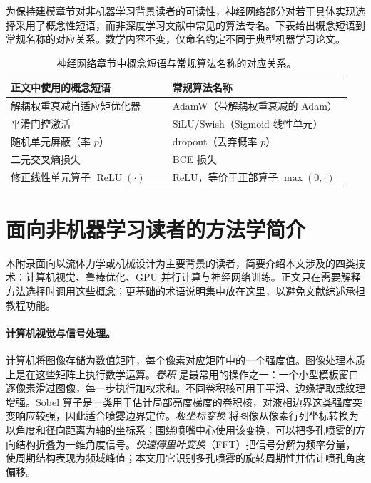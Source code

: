 为保持建模章节对非机器学习背景读者的可读性，神经网络部分对若干具体实现选择采用了概念性短语，而非深度学习文献中常见的算法专名。下表给出概念短语到常规名称的对应关系。数学内容不变，仅命名约定不同于典型机器学习论文。

\begin{table}[h]
\centering
\footnotesize
\begin{tabular}{p{0.45\linewidth} p{0.5\linewidth}}
\toprule
\textbf{正文中使用的概念短语} & \textbf{常规算法名称} \\
\midrule
解耦权重衰减自适应矩优化器 & AdamW（带解耦权重衰减的 Adam） \\
平滑门控激活 & SiLU/Swish（Sigmoid 线性单元） \cite{Ramachandran2017Swish} \\
随机单元屏蔽（率 $p$） & dropout（丢弃概率 $p$） \\
二元交叉熵损失 & BCE 损失 \\
修正线性单元算子 $\operatorname{ReLU}(\cdot)$ & ReLU，等价于正部算子 $\max(0,\cdot)$ \\
\bottomrule
\end{tabular}
\caption{神经网络章节中概念短语与常规算法名称的对应关系。}
\end{table}
\FloatBarrier

\clearpage
\section{面向非机器学习读者的方法学简介}
\label{app:ml-primer-zh}

本附录面向以流体力学或机械设计为主要背景的读者，简要介绍本文涉及的四类技术：计算机视觉、鲁棒优化、GPU 并行计算与神经网络训练。正文只在需要解释方法选择时调用这些概念；更基础的术语说明集中放在这里，以避免文献综述承担教程功能。

\paragraph{计算机视觉与信号处理。}
计算机将图像存储为数值矩阵，每个像素对应矩阵中的一个强度值。图像处理本质上是在这些矩阵上执行数学运算。\emph{卷积} 是最常用的操作之一：一个小型模板窗口逐像素滑过图像，每一步执行加权求和。不同卷积核可用于平滑、边缘提取或纹理增强。Sobel 算子是一类用于估计局部亮度梯度的卷积核，对液相边界这类强度突变响应较强，因此适合喷雾边界定位。\emph{极坐标变换} 将图像从像素行列坐标转换为以角度和径向距离为轴的坐标系；围绕喷嘴中心使用该变换，可以把多孔喷雾的方向结构折叠为一维角度信号。\emph{快速傅里叶变换}（FFT）把信号分解为频率分量，使周期结构表现为频域峰值；本文用它识别多孔喷雾的旋转周期性并估计喷孔角度偏移。

